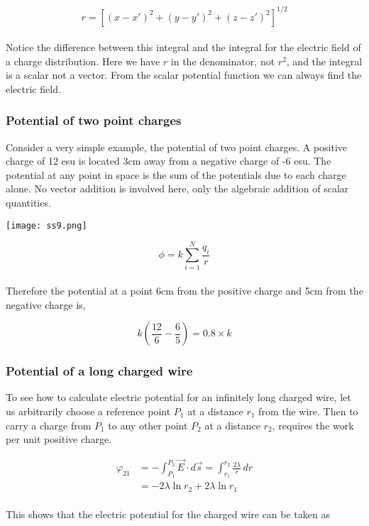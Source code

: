 \documentclass[svgnames]{article}
\begin{document}
 \[ r = [(x-x')^2 + (y-y')^2 + (z-z')^2 ]^{1/2} \] \\
 
 Notice the difference between this integral and the integral for the electric
 field of a charge distribution. Here we have $r$ in the denominator, not
 $r^2$, and the integral is a scalar not a vector. From the scalar potential
 function we can always find the electric field.
 
 \subsubsection{Potential of two point charges} 
 
 Consider a very simple example, the potential of two point charges. A positive
 charge of 12 esu is located 3cm away from a negative charge of -6 esu. The
 potential at any point in space is the sum of the potentials due to each
 charge alone. No vector addition is involved here, only the algebraic addition
 of scalar quantities.

\begin{center}
\texttt{[image: ss9.png]}
\end{center} 

\[ \phi = k\sum_{i=1}^N \frac{q_i}{r} \] \\

Therefore the potential at a point 6cm from the positive charge and 5cm from the negative charge is, 

\[
k (\frac{12}{6} - \frac{6}{5}) = 0.8 \times k
\]

\subsubsection{Potential of a long charged wire} 

To see how to calculate electric potential for an infinitely long charged wire,
let us arbitrarily choose a reference point $P_1$ at a distance $r_1$ from the
wire. Then to carry a charge from $P_1$ to any other point $P_2$ at a distance
$r_2$, requires the work per unit positive charge.

\begin{align*} 
\varphi_{21} &= -\int_{P_1}^{P_2} \vec{E} \cdot d\vec{s} = \int_{r_1}^{r_2} \frac{2\lambda}{r} \, dr \\
&= -2 \lambda \ln r_2 + 2\lambda \ln r_1 
\end{align*} \\

This shows that the electric potential for the charged wire can be taken as 
\end{document}
